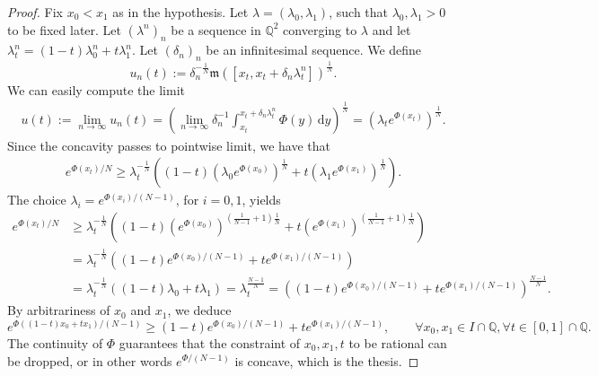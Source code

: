 \documentclass[12pt,a4paper]{amsart}
\theoremstyle{plain}
\theoremstyle{definition}
\numberwithin{equation}{section}
\newcommand{\Q}{\mathbb{Q}}
\newcommand{\de}{{\mathrm{d}}}
\newcommand{\mm}{\mathfrak m}
\begin{document}
  \begin{proof}
  Fix $x_0<x_1$ as in the hypothesis.
  Let $\lambda=(\lambda_0,\lambda_1)$, such that
  $\lambda_0,\lambda_1>0$ to be fixed later.
  Let $(\lambda^n)_n$ be a sequence in $\Q^2$ converging to $\lambda$
  and let $\lambda^n_t=(1-t)\lambda^n_0+t \lambda^n_1$.
  Let $(\delta_n)_n$ be an infinitesimal sequence.
  We define
  \begin{equation}
    u_n(t)
    :=
    \delta_n^{-\frac{1}{N}}
    \mm([x_t,x_t+\delta_n\lambda^n_t])^{\frac{1}{N}}
    .
  \end{equation}
  We can easily compute the limit
  \begin{align*}
    u(t)
    :=
    \lim_{n\to\infty}
    u_n(t)
    =
    \left(
    \lim_{n\to\infty}
    \delta_n^{-1}
    \int_{x_t}^{x_t+\delta_n\lambda^n_t}
    \Phi(y)
    \,
    \de y
    \right)^{\frac{1}{N}}
      =
      (\lambda_t
      e^{\Phi(x_t)}
      )^{\frac{1}{N}}
      .
  \end{align*}
  Since the concavity passes to pointwise limit, we have that
  \begin{align*}
    e^{\Phi(x_t)/N}
    \geq
    \lambda_t^{-\frac{1}{N}}
    \left(
    (1-t)
    (
    \lambda_0
    e^{\Phi(x_0)}
    )^{\frac{1}{N}}
    +
    t
    (
    \lambda_1
    e^{\Phi(x_1)}
    )^{\frac{1}{N}}
    \right)
    .
  \end{align*}
  The choice $\lambda_i=e^{\Phi(x_i)/(N-1)}$, for $i=0,1$, yields
  \begin{align*}
        e^{\Phi(x_t)/N}
    &
      \geq
    \lambda_t^{-\frac{1}{N}}
    \left(
    (1-t)
      (e^{\Phi(x_0)})^{
      (\frac{1}{N-1}+1)
      \frac{1}{N}
      }
    +
    t
      (e^{\Phi(x_1)})^{
      (\frac{1}{N-1}+1)
      \frac{1}{N}
      }
    \right)
    \\
    &
      =
    \lambda_t^{-\frac{1}{N}}
    \left(
    (1-t)
      e^{\Phi(x_0)/(N-1)}
    +
    t
      e^{\Phi(x_1)/(N-1)}
      \right)
    \\
    &
      =
    \lambda_t^{-\frac{1}{N}}
    \left(
    (1-t)
      \lambda_0
    +
    t
      \lambda_1
      \right)
      =
      \lambda_t^{\frac{N-1}{N}}
      =
          \left(
    (1-t)
      e^{\Phi(x_0)/(N-1)}
    +
    t
      e^{\Phi(x_1)/(N-1)}
      \right)^{\frac{N-1}{N}}
      .
  \end{align*}
  By arbitrariness of $x_0$ and $x_1$, we deduce
  \begin{equation*}
    e^{\Phi((1-t)x_0+t x_1)/(N-1)}
    \geq
    (1-t)
    e^{\Phi(x_0)/(N-1)}
    +
    t
    e^{\Phi(x_1)/(N-1)}
    ,
    \qquad
    \forall
    x_0,x_1\in I\cap \Q
    ,
    \forall t\in [0,1]\cap \Q
    .
  \end{equation*}
  The continuity of $\Phi$ guarantees that the constraint of
  $x_0,x_1,t$ to be rational can be dropped, or in other words
  $e^{\Phi/(N-1)}$ is concave, which is the thesis.
\end{proof}
\end{document}
